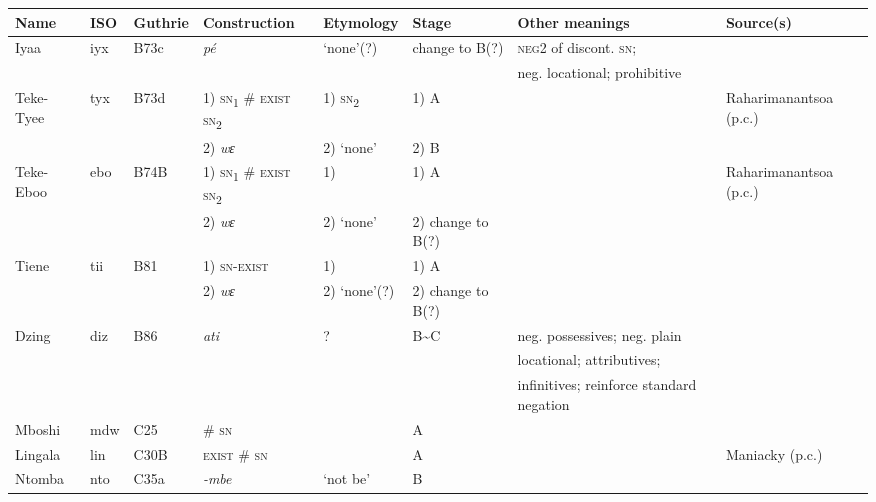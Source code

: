 \documentclass[output=paper,draft,draftmode,colorlinks,citecolor=brown]{langscibook}
\begin{document}
\begin{paperappendix}
\begin{sidewaystable}
\scriptsize
\begin{tabularx}{\textwidth}{llllllQQ}
\lsptoprule
{Name}	&{ISO}	&{Guthrie}	&{Construction}&{Etymology}		&{Stage}	&{Other meanings}&{Source(s)}\\
\midrule
{Iyaa} 	&{iyx} 	&{B73c} 	&\textit{pé}		&`none'(?) 								&change to B(?) 	&\textsc{neg}2 of discont. \textsc{sn};						&\citet{Mouandza2001}\\
				&				&				&				&										&		&neg. locational; prohibitive						&\\
{Teke-Tyee}&{tyx}	&{B73d}	&1) \textsc{sn}\textsubscript{1} \# \textsc{exist} \textsc{sn}\textsubscript{2}%
																&1) \textendash \textsc{sn}\textsubscript{2}%
																										&1) A{}	&												&Raharimanantsoa (p.c.)\\
				&				&				&2) \textit{wɛ}	&2) `none'								&2) B	&												&\\
{Teke-Eboo}&{ebo} 	&{B74B}	&1) \textsc{sn}\textsubscript{1} \# \textsc{exist} \textsc{sn}\textsubscript{2}%
																&1) \textendash							&1) A{}	&												&Raharimanantsoa (p.c.)\\
				&				&				&2) \textit{wɛ}	&2) `none'								&2) change to B(?)	&												&\\
{Tiene} 	&{tii} 		&{B81} 	&1) \textsc{sn-exist}&1) \textendash						&1) A{}	&												&\citet{Ellington1977}\\
				&				&				&2) \textit{wɛ} 	&2) `none'(?)							&2) change to B(?)\\
{Dzing} 	&{diz} 	&{B86} 	&\textit{ati} 		&? 										& B{\textasciitilde}C	& neg. possessives; neg. plain						&\citet{Mertens1938}\\
				&				&				&				&										&		&locational; attributives;\\
				&				&				&				&										&		&infinitives; reinforce standard negation\\
{Mboshi} 	&{mdw} 	&{C25} 	&\# \textsc{sn}	& 										&A 		&  												&\citet{Amboulou1998}\\
{Lingala} 	&{lin}		&{C30B} 	&\textsc{exist} \# \textsc{sn}&\textendash					&A{}	&												&Maniacky (p.c.)\\
{Ntomba} 	&{nto} 	&{C35a} 	&\textit{-mbe} 	&`not be'								&B 		&												&\citet{Mamet1966}\\

\end{tabularx}
\end{sidewaystable}
\end{paperappendix}
\end{document}
